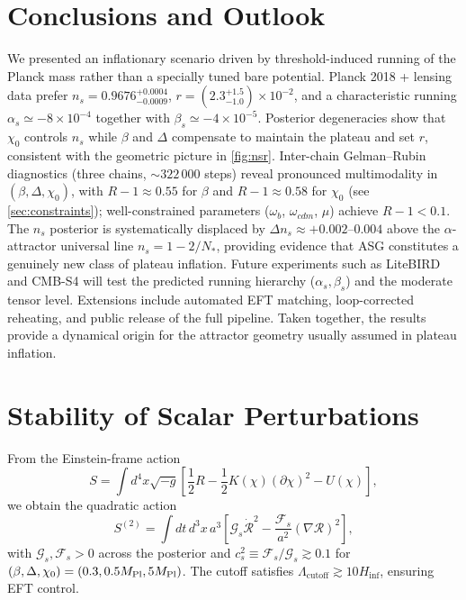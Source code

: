 \documentclass[11pt,a4paper]{article}
\begin{document}
\section{Conclusions and Outlook}
We presented an inflationary scenario driven by threshold-induced running of the Planck mass rather than a specially tuned bare potential. Planck 2018 + lensing data prefer $n_{s}=0.9676^{+0.0004}_{-0.0009}$, $r=(2.3^{+1.5}_{-1.0})\times10^{-2}$, and a characteristic running $\alpha_{s}\simeq-8\times10^{-4}$ together with $\beta_{s}\simeq-4\times10^{-5}$. Posterior degeneracies show that $\chi_{0}$ controls $n_{s}$ while $\beta$ and $\Delta$ compensate to maintain the plateau and set $r$, consistent with the geometric picture in \cref{fig:nsr}. Inter-chain Gelman--Rubin diagnostics (three chains, ${\sim}322\,000$ steps) reveal pronounced multimodality in $(\beta,\Delta,\chi_0)$, with $R{-}1\approx0.55$ for $\beta$ and $R{-}1\approx0.58$ for $\chi_0$ (see \cref{sec:constraints}); well-constrained parameters ($\omega_b$, $\omega_{cdm}$, $\mu$) achieve $R{-}1<0.1$. The $n_s$ posterior is systematically displaced by $\Delta n_s\approx+0.002$--$0.004$ above the $\alpha$-attractor universal line $n_s=1-2/N_*$, providing evidence that ASG constitutes a genuinely new class of plateau inflation. Future experiments such as LiteBIRD and CMB-S4 will test the predicted running hierarchy ($\alpha_{s},\beta_{s}$) and the moderate tensor level. Extensions include automated EFT matching, loop-corrected reheating, and public release of the full pipeline. Taken together, the results provide a dynamical origin for the attractor geometry usually assumed in plateau inflation.

\section{Stability of Scalar Perturbations}
\label{sec:stability}
From the Einstein-frame action
\begin{equation}
S=\int d^{4}x\sqrt{-g}\left[\frac{1}{2}R-\frac{1}{2}K(\chi)(\partial\chi)^{2}-U(\chi)\right],
\end{equation}
we obtain the quadratic action
\begin{equation}
S^{(2)}=\int dt\,d^{3}x\,a^{3}\left[\mathcal{G}_{s}\dot{\mathcal{R}}^{2}-\frac{\mathcal{F}_{s}}{a^{2}}(\nabla\mathcal{R})^{2}\right],
\end{equation}
with $\mathcal{G}_{s},\mathcal{F}_{s}>0$ across the posterior and $c_{s}^{2}\equiv\mathcal{F}_{s}/\mathcal{G}_{s}\gtrsim0.1$ for $(\beta,\Delta,\chi_{0})=(0.3,0.5M_{\rm Pl},5M_{\rm Pl})$. The cutoff satisfies $\Lambda_{\text{cutoff}}\gtrsim10H_{\text{inf}}$, ensuring EFT control.
\end{document}
